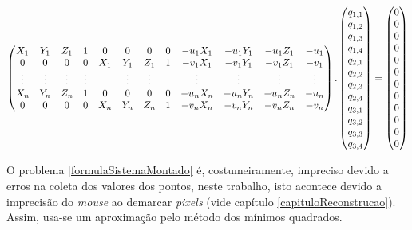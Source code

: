 	\begin{equation}
		\label{formulaSistemaMontado}
		\setcounter{MaxMatrixCols}{20}
		\begin{pmatrix}
			X_{1} & Y_{1} & Z_{1} & 1 & 0 & 0 & 0 & 0 & -u_{1}X_{1} & -u_{1}Y_{1} & -u_{1}Z_{1} & -u_{1} \\
			0 & 0 & 0 & 0 & X_{1} & Y_{1} & Z_{1} & 1 & -v_{1}X_{1} & -v_{1}Y_{1} & -v_{1}Z_{1} & -v_{1} \\
			\vdots & \vdots & \vdots & \vdots & \vdots & \vdots & \vdots & \vdots & \vdots & \vdots & \vdots & \vdots \\
			X_{n} & Y_{n} & Z_{n} & 1 & 0 & 0 & 0 & 0 & -u_{n}X_{n} & -u_{n}Y_{n} & -u_{n}Z_{n} & -u_{n} \\
			0 & 0 & 0 & 0 & X_{n} & Y_{n} & Z_{n} & 1 & -v_{n}X_{n} & -v_{n}Y_{n} & -v_{n}Z_{n} & -v_{n}	
		\end{pmatrix}
		.
		\begin{pmatrix}
			q_{1,1} \\
			q_{1,2} \\
			q_{1,3} \\
			q_{1,4} \\
			q_{2,1} \\
			q_{2,2} \\
			q_{2,3} \\
			q_{2,4} \\
			q_{3,1} \\
			q_{3,2} \\
			q_{3,3} \\
			q_{3,4} \\
		\end{pmatrix}
		=
		\begin{pmatrix}
			0 \\
			0 \\
			0 \\
			0 \\
			0 \\
			0 \\
			0 \\
			0 \\
			0 \\
			0 \\
			0 \\
			0 \\
		\end{pmatrix}
	\end{equation}
	
	O problema \ref{formulaSistemaMontado} é, costumeiramente, impreciso devido a erros na coleta dos valores dos pontos, neste trabalho, isto acontece devido a imprecisão do \textit{mouse} ao demarcar \textit{pixels} (vide capítulo \ref{capituloReconstrucao}). Assim, usa-se um aproximação pelo método dos mínimos quadrados.
	
